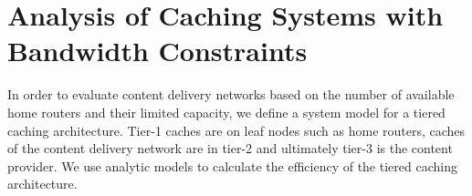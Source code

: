 \section{Analysis of Caching Systems with Bandwidth Constraints}\label{sec:hierarchical:analyticbw:model}

In order to evaluate content delivery networks based on the number of available home routers and their limited capacity, we define a system model for a tiered caching architecture.
Tier-1 caches are on leaf nodes such as home routers, caches of the content delivery network are in tier-2 and ultimately tier-3 is the content provider.
We use analytic models to calculate the efficiency of the tiered caching architecture.






